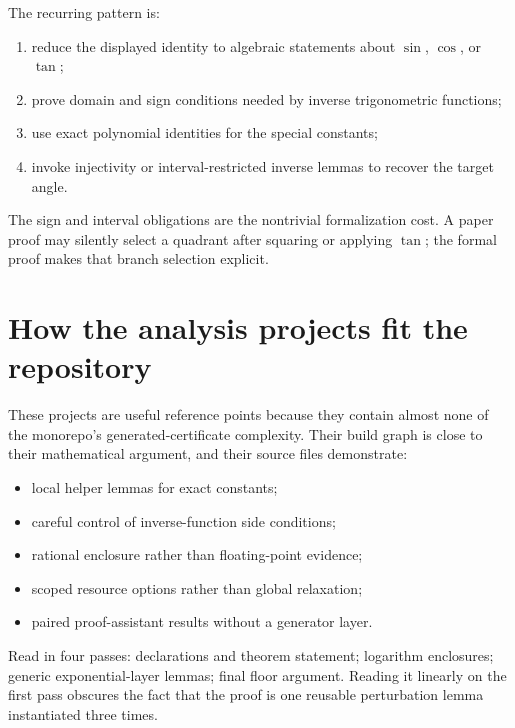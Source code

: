 \documentclass[
  10pt,
  a4paper,
  twoside,
  open=any,
  parskip=half,
  headings=big
]{scrreprt}
\newcommand{\code}[1]{\texttt{\detokenize{#1}}}
\begin{document}
The recurring pattern is:

\begin{enumerate}
  \item reduce the displayed identity to algebraic statements about
        \(\sin\), \(\cos\), or \(\tan\);
  \item prove domain and sign conditions needed by inverse trigonometric
        functions;
  \item use exact polynomial identities for the special constants;
  \item invoke injectivity or interval-restricted inverse lemmas to recover the
        target angle.
\end{enumerate}

The sign and interval obligations are the nontrivial formalization cost.
A paper proof may silently select a quadrant after squaring or applying
\(\tan\); the formal proof makes that branch selection explicit.

\section{How the analysis projects fit the repository}

These projects are useful reference points because they contain almost none of
the monorepo's generated-certificate complexity.  Their build graph is close
to their mathematical argument, and their source files demonstrate:

\begin{itemize}
  \item local helper lemmas for exact constants;
  \item careful control of inverse-function side conditions;
  \item rational enclosure rather than floating-point evidence;
  \item scoped resource options rather than global relaxation;
  \item paired proof-assistant results without a generator layer.
\end{itemize}

\begin{readingbox}
Read \code{TinyExponentTower.lean} in four passes: declarations and theorem
statement; logarithm enclosures; generic exponential-layer lemmas; final
floor argument.  Reading it linearly on the first pass obscures the fact that
the proof is one reusable perturbation lemma instantiated three times.
\end{readingbox}
\end{document}

